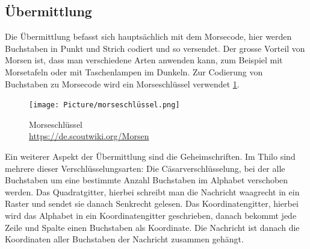 \subsection*{Übermittlung}
Die Übermittlung befasst sich hauptsächlich mit dem Morsecode, hier werden Buchstaben in Punkt und Strich codiert und so versendet. Der grosse Vorteil von Morsen ist, dass man verschiedene Arten anwenden kann, zum Beispiel mit Morsetafeln oder mit Taschenlampen im Dunkeln. Zur Codierung von Buchstaben zu Morsecode wird ein Morseschlüssel verwendet \cref{fig:Morseschlüssel}.
\begin{figure}[h]
    \centering
    \texttt{[image: Picture/morseschlüssel.png]}
\caption{Morseschlüssel \\ \url{https://de.scoutwiki.org/Morsen}}
\label{fig:Morseschlüssel}
\end{figure}
\par
Ein weiterer Aspekt der Übermittlung sind die Geheimschriften. Im Thilo \cite{noauthor_thilo_2014} sind mehrere dieser Verschlüsselungsarten: Die Cäsarverschlüsselung, bei der alle Buchstaben um eine bestimmte Anzahl Buchstaben im Alphabet verschoben werden. Das Quadratgitter, hierbei schreibt man die Nachricht waagrecht in ein Raster und sendet sie danach Senkrecht gelesen. Das Koordinatengitter, hierbei wird das Alphabet in ein Koordinatengitter geschrieben, danach bekommt jede Zeile und Spalte einen Buchstaben als Koordinate. Die Nachricht ist danach die Koordinaten aller Buchstaben der Nachricht zusammen gehängt.
